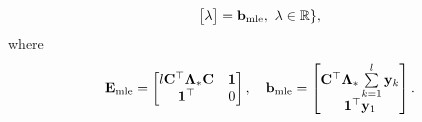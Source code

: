 \documentclass[a4paper, 11pt]{article}
\newcommand{\R}{\mathbb{R}}
\newcommand{\1}{\mathbf{1}}
\newcommand{\yb}{\mathbf{y}}
\newcommand{\Cb}{\mathbf{C}}
\newcommand{\cb}{\mathbf{c}}
\newcommand{\phib}{\bm{\phi}}
\newcommand{\betab}{\bm{\beta}}
\newcommand{\Lambdab}{\bm{\Lambda}}
\newcommand{\betamlefs}{{\betab}_{\textnormal{mle}}}
\newcommand{\emlefs}{\mathbf{E}_{\textnormal{mle}}}
\newcommand{\bmlefs}{\mathbf{b}_{\textnormal{mle}}}
\begin{document}
{{\begin{equation}
\begin{aligned}
\begin{bmatrix}
		\lambda
		\end{bmatrix}=
		\bmlefs,\ \lambda\in\R\},
		\end{aligned}
		\end{equation}
		where
		\begin{equation}\notag
		\emlefs=
		\begin{bmatrix}
		l\Cb^\top\Lambdab_\ast \Cb & \1\\
		\1^\top & 0
		\end{bmatrix},\quad
		\bmlefs=
		\begin{bmatrix}
		\Cb^\top\Lambdab_\ast \sum\limits_{k=1}^l\yb_k\\
		\1^\top\yb_1
		\end{bmatrix}.
		\end{equation}
	
	}
	
	
	
	
	
}
\end{document}
